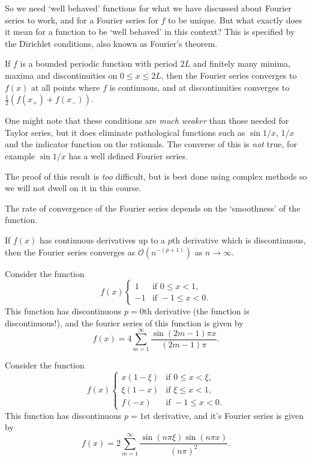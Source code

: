 \documentclass[a4paper]{scrartcl}
\begin{document}
So we need `well behaved' functions for what we have discussed about Fourier series to work, and for a Fourier series for $f$ to be unique. But what exactly does it mean for a function to be `well behaved' in this context?
This is specified by the Dirichlet conditions, also known as Fourier's theorem.

\begin{theorem}
    If $f$ is a bounded periodic function with period $2L$ and finitely many minima, maxima and discontinuities on $0 \leq x \leq 2L$, then the Fourier series converges to $f(x)$ at all points where $f$ is continuous, and at discontinuities converges to $\frac{1}{2}(f(x_+) + f(x_-))$.
\end{theorem}

One might note that these conditions are \emph{much weaker} than those needed for Taylor series, but it does eliminate pathological functions such as $\sin 1/x$, $1/x$ and the indicator function on the rationals. 
The converse of this is \emph{not} true, for example $\sin 1/x$ has a well defined Fourier series. 

The proof of this result is \emph{too} difficult, but is best done using complex methods so we will not dwell on it in this course.

The rate of convergence of the Fourier series depends on the `smoothness' of the function.

\begin{theorem}
If $f(x)$ has continuous derivatives up to a $p$th derivative which is discontinuous, then the Fourier series converges as $\mathcal{O}(n^{-(p + 1)})$ as $n \rightarrow \infty$.    
\end{theorem}

\begin{example}\label{ex:square}
    Consider the function
    $$
    f(x) \begin{cases}
        1 &\mbox{if } 0 \leq x < 1, \\
        -1 &\mbox{if } -1 \leq x < 0.
       \end{cases}
    $$
    This function has discontinuous $p = 0$th derivative (the function is discontinuous!), and the fourier series of this function is given by
    $$
    f(x) = 4 \sum_{m=1}^{\infty} \frac{\sin (2 m-1) \pi x}{(2 m-1) \pi}.
    $$
\end{example}

\begin{example}
    Consider the function
    $$
    f(x) \begin{cases}
        x(1 - \xi) &\mbox{if } 0 \leq x < \xi, \\
        \xi(1 - x) &\mbox{if } \xi \leq x < 1,\\
        f(-x) &\mbox{if } -1 \leq x < 0.
       \end{cases}
    $$
    This function has discontinuous $p = 1$st derivative, and it's Fourier series is given by
    $$
       f(x) = 2 \sum_{m=1}^{\infty} \frac{\sin (n \pi \xi) \sin (n \pi x)}{(n \pi)^{2}}.
    $$
\end{example}
\end{document}
